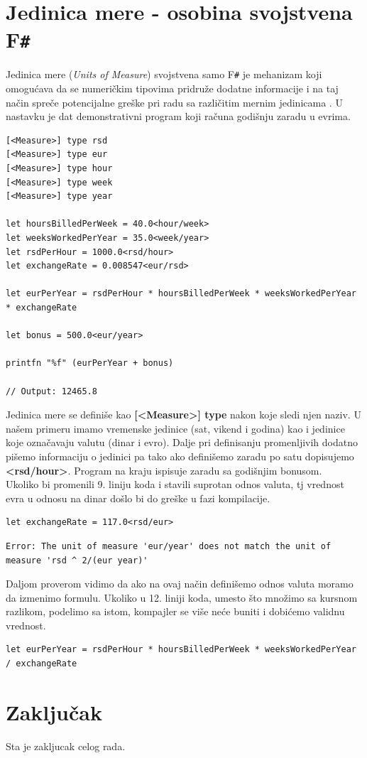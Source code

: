 \documentclass[a4paper]{article}
\begin{document}
\section{Jedinica mere - osobina svojstvena F\texttt{\#}}
Jedinica mere (\textit{Units of Measure}) svojstvena samo F\texttt{\#} je mehanizam koji omogućava da se numeričkim tipovima pridruže dodatne informacije i na taj način spreče potencijalne greške pri radu sa različitim mernim jedinicama \cite{unitsOfMeasure}. U nastavku je dat demonstrativni program koji računa godišnju zaradu u evrima.
\begin{lstlisting}[caption={Primer jedinice mere\cite{unitsOfMeasureExample}},frame=single, label=primer]
[<Measure>] type rsd
[<Measure>] type eur
[<Measure>] type hour
[<Measure>] type week
[<Measure>] type year

let hoursBilledPerWeek = 40.0<hour/week>
let weeksWorkedPerYear = 35.0<week/year>
let rsdPerHour = 1000.0<rsd/hour>
let exchangeRate = 0.008547<eur/rsd>

let eurPerYear = rsdPerHour * hoursBilledPerWeek * weeksWorkedPerYear * exchangeRate

let bonus = 500.0<eur/year>

printfn "%f" (eurPerYear + bonus)

// Output: 12465.8

\end{lstlisting}
Jedinica mere se definiše kao \textbf{[<Measure>] type} nakon koje sledi njen naziv. U našem primeru imamo vremenske jedinice (sat, vikend i godina) kao i jedinice koje označavaju valutu (dinar i evro). Dalje pri definisanju promenljivih dodatno pišemo informaciju o jedinici pa tako ako definišemo zaradu po satu dopisujemo \textbf{<rsd/hour>}. Program na kraju ispisuje zaradu sa godišnjim bonusom. \\
Ukoliko bi promenili 9. liniju koda i stavili suprotan odnos valuta, tj vrednost evra u odnosu na dinar došlo bi do greške u fazi kompilacije. 
\begin{lstlisting}[caption={Promenjen odnos valuta},frame=single, label=primer, firstnumber=9]
let exchangeRate = 117.0<rsd/eur>
\end{lstlisting}
\begin{lstlisting}[caption={Kompajler prepoznaje grešku},frame=single, label=primer]
Error: The unit of measure 'eur/year' does not match the unit of measure 'rsd ^ 2/(eur year)'
\end{lstlisting}
Daljom proverom vidimo da ako na ovaj način definišemo odnos valuta moramo da izmenimo formulu. Ukoliko u 12. liniji koda, umesto što množimo sa kursnom razlikom, podelimo sa istom, kompajler se više neće buniti i dobićemo validnu vrednost.
\begin{lstlisting}[caption={Ispravljena linija},frame=single, label=primer, firstnumber=12]
let eurPerYear = rsdPerHour * hoursBilledPerWeek * weeksWorkedPerYear / exchangeRate
\end{lstlisting}

\section{Zaključak}
\label{sec:zakljucak}

Sta je zakljucak celog rada.

\appendix
 

\end{document}
